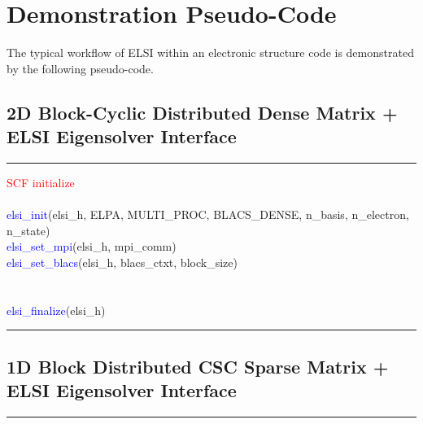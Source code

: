 \documentclass{report}
\begin{document}
\section{Demonstration Pseudo-Code}
\label{sec:example}
The typical workflow of ELSI within an electronic structure code is demonstrated by the following pseudo-code.\\

\subsection{2D Block-Cyclic Distributed Dense Matrix + ELSI Eigensolver Interface}
\label{subsec:example_ev_blacs}
\noindent\rule{18cm}{0.4pt}

\begin{algorithm}[H]
\textcolor{red}{SCF initialize}\\
\hspace{0.3cm}\\
\textcolor{blue}{elsi\_init}(elsi\_h, ELPA, MULTI\_PROC, BLACS\_DENSE, n\_basis, n\_electron, n\_state)\\
\textcolor{blue}{elsi\_set\_mpi}(elsi\_h, mpi\_comm)\\
\textcolor{blue}{elsi\_set\_blacs}(elsi\_h, blacs\_ctxt, block\_size)\\
\hspace{0.3cm}\\
\hspace{0.3cm}\\
\textcolor{blue}{elsi\_finalize}(elsi\_h)\\
\end{algorithm}

\noindent\rule{18cm}{0.4pt}

\subsection{1D Block Distributed CSC Sparse Matrix + ELSI Eigensolver Interface}
\label{subsec:example_ev_csc}
\noindent\rule{18cm}{0.4pt}
\end{document}
